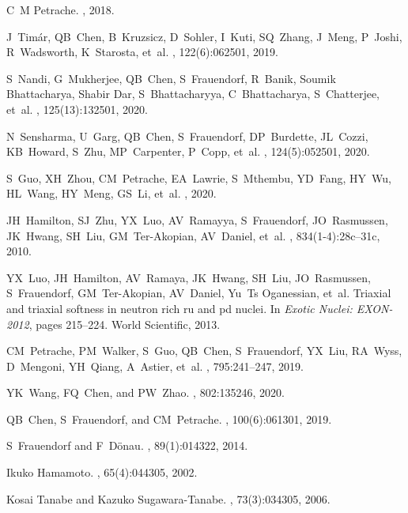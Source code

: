 \documentclass[myclassdoc,debug]{rjparticle}
\begin{document}
\begin{thebibliography}{99}
C~M Petrache.
, 2018.

J~Tim{\'a}r, QB~Chen, B~Kruzsicz, D~Sohler, I~Kuti, SQ~Zhang, J~Meng, P~Joshi,
  R~Wadsworth, K~Starosta, et~al.
, 122(6):062501, 2019.

S~Nandi, G~Mukherjee, QB~Chen, S~Frauendorf, R~Banik, Soumik Bhattacharya,
  Shabir Dar, S~Bhattacharyya, C~Bhattacharya, S~Chatterjee, et~al.
, 125(13):132501, 2020.

N~Sensharma, U~Garg, QB~Chen, S~Frauendorf, DP~Burdette, JL~Cozzi, KB~Howard,
  S~Zhu, MP~Carpenter, P~Copp, et~al.
, 124(5):052501, 2020.

S~Guo, XH~Zhou, CM~Petrache, EA~Lawrie, S~Mthembu, YD~Fang, HY~Wu, HL~Wang,
  HY~Meng, GS~Li, et~al.
, 2020.

JH~Hamilton, SJ~Zhu, YX~Luo, AV~Ramayya, S~Frauendorf, JO~Rasmussen, JK~Hwang,
  SH~Liu, GM~Ter-Akopian, AV~Daniel, et~al.
, 834(1-4):28c--31c, 2010.

YX~Luo, JH~Hamilton, AV~Ramaya, JK~Hwang, SH~Liu, JO~Rasmussen, S~Frauendorf,
  GM~Ter-Akopian, AV~Daniel, Yu~Ts Oganessian, et~al.
\newblock Triaxial and triaxial softness in neutron rich ru and pd nuclei.
\newblock In {\em Exotic Nuclei: EXON-2012}, pages 215--224. World Scientific,
  2013.


CM~Petrache, PM~Walker, S~Guo, QB~Chen, S~Frauendorf, YX~Liu, RA~Wyss,
  D~Mengoni, YH~Qiang, A~Astier, et~al.
, 795:241--247, 2019.

YK~Wang, FQ~Chen, and PW~Zhao.
, 802:135246, 2020.

QB~Chen, S~Frauendorf, and CM~Petrache.
, 100(6):061301, 2019.

S~Frauendorf and F~D{\"o}nau.
, 89(1):014322, 2014.

Ikuko Hamamoto.
, 65(4):044305, 2002.

Kosai Tanabe and Kazuko Sugawara-Tanabe.
, 73(3):034305, 2006.


\end{thebibliography}
\end{document}

